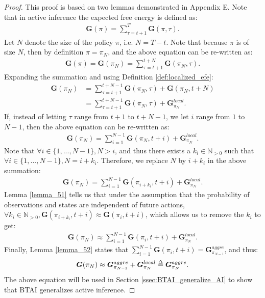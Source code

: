 \documentclass[twoside,11pt]{article}
\def\delequal{\mathrel{\ensurestackMath{\stackon[1pt]{=}{\scriptstyle\Delta}}}}
\begin{document}
\begin{proof}
This proof is based on two lemmas demonstrated in Appendix E. Note that in active inference the expected free energy is defined as:
\begin{align}
\bm{G}(\pi) = \sum_{\tau=t + 1}^{T} \bm{G}(\pi, \tau).
\end{align}
Let $N$ denote the size of the policy $\pi$, i.e. $N = T - t$. Note that because $\pi$ is of size $N$, then by definition $\pi = \pi_N$, and the above equation can be re-written as:
\begin{align}
\bm{G}(\pi) = \bm{G}(\pi_N) = \sum_{\tau=t + 1}^{t+N} \bm{G}(\pi_{N}, \tau).
\end{align}
Expanding the summation and using Definition \ref{def:localized_efe}:
\begin{align}
\bm{G}(\pi_N) &= \sum_{\tau=t + 1}^{t+N-1} \bm{G}(\pi_N, \tau) + \bm{G}(\pi_N,t+N)\\
&= \sum_{\tau=t + 1}^{t+N-1} \bm{G}(\pi_N, \tau) + \bm{G}^{local}_{\pi_N}.
\end{align}
If, instead of letting $\tau$ range from $t + 1$ to $t+N-1$, we let $i$ range from $1$ to $N-1$, then the above equation can be re-written as:
\begin{align}
\bm{G}(\pi_N) = \sum_{i=1}^{N-1} \bm{G}(\pi_N, t + i) + \bm{G}^{local}_{\pi_N}.
\end{align}
Note that $\forall i \in \{1, ..., N-1\}, N > i$, and thus there exists a $k_i \in \mathbb{N}_{>0}$ such that $\forall i \in \{1, ..., N-1\}, N = i + k_i$. Therefore, we replace $N$ by $i + k_i$ in the above summation:
\begin{align}
\bm{G}(\pi_N) = \sum_{i=1}^{N-1} \bm{G}(\pi_{i+k_i}, t + i) + \bm{G}^{local}_{\pi_N}.
\end{align}
Lemma \ref{lemma_51} tells us that under the assumption that the probability of observations and states are independent of future actions, $\forall k_i \in \mathbb{N}_{>0}, \bm{G}(\pi_{i+k_i}, t+i) \approx \bm{G}(\pi_i, t+i)$, which allows us to remove the $k_i$ to get:
\begin{align}
\bm{G}(\pi_N) \approx \sum_{i=1}^{N-1} \bm{G}(\pi_i, t + i) + \bm{G}^{local}_{\pi_N}.
\end{align}
Finally, Lemma \ref{lemma_52} states that $\sum_{i=1}^{N-1} \bm{G}(\pi_i, t + i) = \bm{G}^{aggre}_{\pi_{N-1}}$, and thus:
\begin{align}
\bm{G}(\pi_N) \approx \bm{G}^{aggre}_{\pi_{N-1}} + \bm{G}^{local}_{\pi_N} \delequal \bm{G}^{aggre}_{\pi_N}.
\end{align}
The above equation will be used in Section \ref{ssec:BTAI_generalize_AI} to show that BTAI generalizes active inference.
\end{proof}
\end{document}
